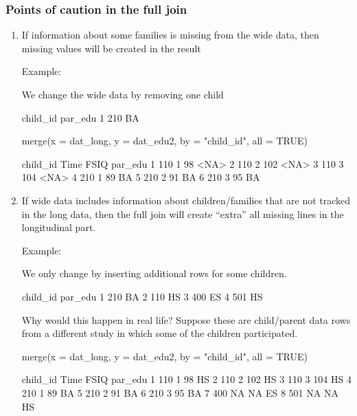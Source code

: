 \documentclass[10pt,american]{beamer}
\renewenvironment{Schunk}{}{}
\renewenvironment{Sinput}{}{}
\providecommand*{\code}[1]{\texttt{#1}}
\providecommand*{\code}[1]{\texttt{#1}}
\renewcommand{\code}[1]{
\Colorbox{light-gray}{#1}
}
\begin{document}
\begin{frame}
\frametitle{Points of caution in the full join}
    \begin{enumerate}
      \item If information about some families is missing from the
        wide data, then missing values will be created in the result
 
        Example:
        
        We change the wide data by removing one child

\begin{Schunk}
\begin{Soutput}
  child_id par_edu
1      210      BA
\end{Soutput}
\end{Schunk}

\begin{Schunk}
\begin{Sinput}
 merge(x = dat_long, y = dat_edu2, by = "child_id", all = TRUE)
\end{Sinput}
\begin{Soutput}
  child_id Time FSIQ par_edu
1      110    1   98    <NA>
2      110    2  102    <NA>
3      110    3  104    <NA>
4      210    1   89      BA
5      210    2   91      BA
6      210    3   95      BA
\end{Soutput}
\end{Schunk}

\framebreak
    \item If wide data includes information about children/families
        that are not tracked in the long data, then the full join will
        create ``extra'' all missing lines in the longitudinal part.
    
    Example:
    

We only change \code{dat\_edu} by inserting additional rows for some
children. 
    
\begin{Schunk}
\begin{Soutput}
  child_id par_edu
1      210      BA
2      110      HS
3      400      ES
4      501      HS
\end{Soutput}
\end{Schunk}

Why would this happen in real life? Suppose these are child/parent
data rows from a different study in which some of the children
participated.  

\framebreak
\begin{Schunk}
\begin{Sinput}
 merge(x = dat_long, y = dat_edu2, by = "child_id", all = TRUE)
\end{Sinput}
\begin{Soutput}
  child_id Time FSIQ par_edu
1      110    1   98      HS
2      110    2  102      HS
3      110    3  104      HS
4      210    1   89      BA
5      210    2   91      BA
6      210    3   95      BA
7      400   NA   NA      ES
8      501   NA   NA      HS
\end{Soutput}
\end{Schunk}
\framebreak


\end{enumerate}
\end{frame}
\end{document}
